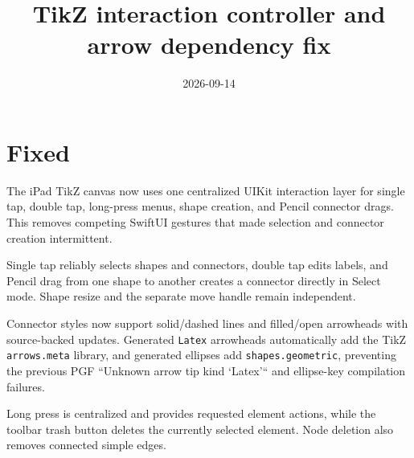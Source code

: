\documentclass[a4paper]{article}
\title{TikZ interaction controller and arrow dependency fix}
\date{2026-09-14}
\author{}
\begin{document}
\maketitle

\section*{Fixed}
The iPad TikZ canvas now uses one centralized UIKit interaction layer for single tap, double tap, long-press menus, shape creation, and Pencil connector drags. This removes competing SwiftUI gestures that made selection and connector creation intermittent.

Single tap reliably selects shapes and connectors, double tap edits labels, and Pencil drag from one shape to another creates a connector directly in Select mode. Shape resize and the separate move handle remain independent.

Connector styles now support solid/dashed lines and filled/open arrowheads with source-backed updates. Generated \texttt{Latex} arrowheads automatically add the TikZ \texttt{arrows.meta} library, and generated ellipses add \texttt{shapes.geometric}, preventing the previous PGF ``Unknown arrow tip kind `Latex'`` and ellipse-key compilation failures.

Long press is centralized and provides requested element actions, while the toolbar trash button deletes the currently selected element. Node deletion also removes connected simple edges.
\end{document}
